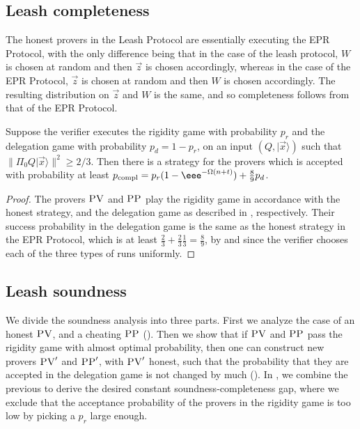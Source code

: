 \documentclass{toc}
\newcommand{\ket}[1]{|#1\rangle}
\DeclareMathOperator{\compl}{compl}
\newcommand{\pv}{\textsc{PV}}
\newcommand{\pp}{\textsc{PP}}
\begin{document}
%
%
\subsection{Leash completeness}   %

The honest provers in the Leash Protocol are essentially executing the EPR Protocol, with the only difference being that in the case of the leash protocol, $W$ is chosen at random and then $\vec{z}$ is chosen accordingly, whereas in the case of the EPR Protocol, $\vec{z}$ is chosen at random and then $W$ is chosen accordingly. The resulting distribution on $\vec{z}$ and $W$ is the same, and so completeness follows from that of the EPR Protocol.

\begin{lemma}\label{lem:leash-completeness}
Suppose the verifier executes the rigidity game with probability $p_r$ and the delegation game with probability $p_d=1-p_r$, on an input $(Q,\ket{\vec{x}})$ such that $\|\Pi_0 Q \ket{\vec{x}}\|^2 \geq 2/3$. Then there is a strategy for the provers which is accepted with probability at least $p_{\compl} = p_r(1-\eee^{-\Omega(n+t)}) + \frac{8}{9}p_d$. 
\end{lemma}

\begin{proof}
The provers $\pv$ and $\pp$ play the rigidity game 
%
in accordance with %
the honest strategy, and the delegation game as described in  ,
%
 respectively. Their success probability in the delegation game is the same as the honest strategy in the EPR Protocol, which is at least $\frac{2}{3}+\frac{2}{3}\frac{1}{3}=\frac{8}{9}$, by  and since the verifier chooses each of the three types of runs uniformly.
\end{proof}

%

\subsection{Leash soundness}   %
%

We divide the soundness analysis into three parts. First we analyze the case of an honest $\pv$, and a cheating $\pp$ (). Then we show that if $\pv$ and $\pp$ pass the rigidity game with almost optimal probability, then one can construct new provers $\pv'$ and $\pp'$, with $\pv'$ honest, such that the probability that they are accepted in the delegation game is not changed by much (). In , we combine the previous to derive the desired constant soundness-completeness gap, where we exclude that the acceptance probability of the provers in the rigidity game is too low by picking a $p_r$ large enough.
\end{document}
